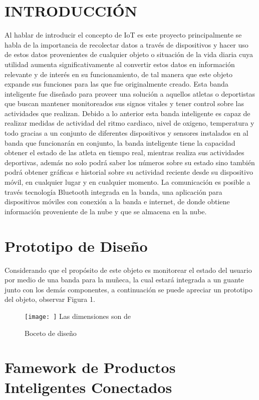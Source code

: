 \documentclass[osajnl,twocolumn,showpacs,superscriptaddress,10pt]{revtex4-1}
\begin{document}
\section{INTRODUCCIÓN}
Al hablar de introducir el concepto de IoT es este proyecto principalmente se habla de la importancia de recolectar datos a través de dispositivos y hacer uso de estos datos provenientes de cualquier objeto o situación de la vida diaria cuya utilidad aumenta significativamente al convertir estos datos en información relevante y de interés en su funcionamiento, de tal manera que este objeto expande sus funciones para las que fue originalmente creado. Esta banda inteligente fue diseñado para proveer una solución a aquellos atletas o deportistas que buscan mantener monitoreados sus signos vitales y tener control sobre las actividades que realizan. Debido a lo anterior esta banda inteligente es capaz de realizar medidas de actividad del ritmo cardiaco, nivel de oxigeno, temperatura y todo gracias a un conjunto de diferentes dispositivos y sensores instalados en al banda que funcionarán en conjunto, la banda inteligente tiene la capacidad obtener el estado de las atleta en tiempo real, mientras realiza sus actividades deportivas, además no solo podrá saber los números sobre su estado sino también podrá obtener gráficas e historial sobre su actividad reciente desde su dispositivo móvil, en cualquier lugar y en cualquier momento. La comunicación es posible a través tecnología Bluetooth integrada en la banda, una aplicación para dispositivos móviles con conexión a la banda e internet, de donde obtiene información proveniente de la nube y que se almacena en la nube.

\section{Prototipo de Diseño}
Considerando que el propósito de este objeto es monitorear el estado del usuario por medio de una banda para la muñeca, la cual estará integrada a un guante junto con los demás componentes, a continuación se puede apreciar un prototipo del objeto, observar Figura 1.


\begin{figure} [H] \centering 
\caption{Boceto de diseño}

\texttt{[image: ]} 
Las dimensiones son de 
\end{figure}

\section{Famework de Productos Inteligentes Conectados}
\end{document}
